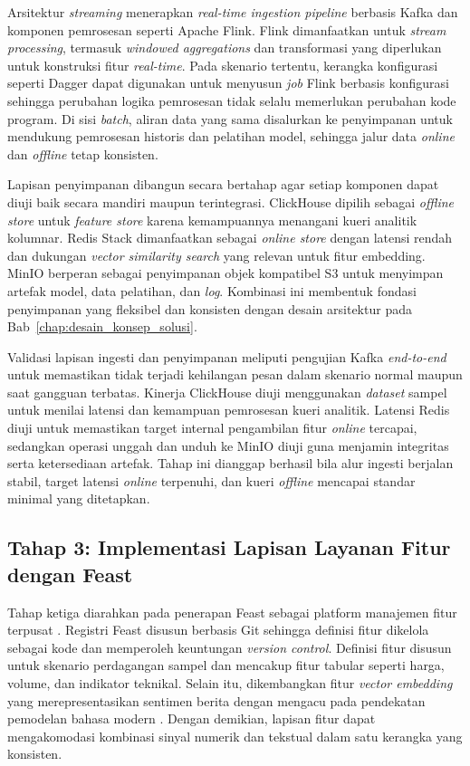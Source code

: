 Arsitektur \textit{streaming} menerapkan \textit{real-time ingestion pipeline} berbasis Kafka dan komponen pemrosesan seperti Apache Flink. Flink dimanfaatkan untuk \textit{stream processing}, termasuk \textit{windowed aggregations} dan transformasi yang diperlukan untuk konstruksi fitur \textit{real-time}. Pada skenario tertentu, kerangka konfigurasi seperti Dagger dapat digunakan untuk menyusun \textit{job} Flink berbasis konfigurasi sehingga perubahan logika pemrosesan tidak selalu memerlukan perubahan kode program. Di sisi \textit{batch}, aliran data yang sama disalurkan ke penyimpanan untuk mendukung pemrosesan historis dan pelatihan model, sehingga jalur data \textit{online} dan \textit{offline} tetap konsisten.

Lapisan penyimpanan dibangun secara bertahap agar setiap komponen dapat diuji baik secara mandiri maupun terintegrasi. ClickHouse dipilih sebagai \textit{offline store} untuk \textit{feature store} karena kemampuannya menangani kueri analitik kolumnar. Redis Stack dimanfaatkan sebagai \textit{online store} dengan latensi rendah dan dukungan \textit{vector similarity search} yang relevan untuk fitur embedding. MinIO berperan sebagai penyimpanan objek kompatibel S3 untuk menyimpan artefak model, data pelatihan, dan \textit{log}. Kombinasi ini membentuk fondasi penyimpanan yang fleksibel dan konsisten dengan desain arsitektur pada Bab~\ref{chap:desain_konsep_solusi}.

Validasi lapisan ingesti dan penyimpanan meliputi pengujian Kafka \textit{end-to-end} untuk memastikan tidak terjadi kehilangan pesan dalam skenario normal maupun saat gangguan terbatas. Kinerja ClickHouse diuji menggunakan \textit{dataset} sampel untuk menilai latensi dan kemampuan pemrosesan kueri analitik. Latensi Redis diuji untuk memastikan target internal pengambilan fitur \textit{online} tercapai, sedangkan operasi unggah dan unduh ke MinIO diuji guna menjamin integritas serta ketersediaan artefak. Tahap ini dianggap berhasil bila alur ingesti berjalan stabil, target latensi \textit{online} terpenuhi, dan kueri \textit{offline} mencapai standar minimal yang ditetapkan.

\subsection{Tahap 3: Implementasi Lapisan Layanan Fitur dengan Feast}

Tahap ketiga diarahkan pada penerapan Feast sebagai platform manajemen fitur terpusat \parencite{feast2024}. Registri Feast disusun berbasis Git sehingga definisi fitur dikelola sebagai kode dan memperoleh keuntungan \textit{version control}. Definisi fitur disusun untuk skenario perdagangan sampel dan mencakup fitur tabular seperti harga, volume, dan indikator teknikal. Selain itu, dikembangkan fitur \textit{vector embedding} yang merepresentasikan sentimen berita dengan mengacu pada pendekatan pemodelan bahasa modern \parencite{devlin2019bert,munappy2022data}. Dengan demikian, lapisan fitur dapat mengakomodasi kombinasi sinyal numerik dan tekstual dalam satu kerangka yang konsisten.

